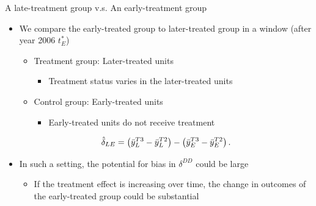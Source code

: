 \documentclass[dvipsnames,hyperref={pdfpagelabels=false}]{beamer}
\begin{document}
\begin{frame}{A late-treatment group v.s. An early-treatment group}{}
	\begin{itemize}
		
		\item We compare the early-treated group to
		later-treated group in a window (after year 2006 $t^{*}_{E}$)
		\vspace{0.2cm}
	\begin{itemize}
		\item Treatment group: Later-treated units
	\vspace{0.2cm}
	\begin{itemize}
		\item Treatment status varies in the later-treated units
	\end{itemize}
	\vspace{0.2cm}
		\item Control group: Early-treated units
		\vspace{0.2cm}
	\begin{itemize}
		\item Early-treated units do not receive treatment	
	\end{itemize}	
			\vspace{0.2cm}
	\end{itemize}	
		
		
		\begin{equation*}
			\hat{\delta}_{LE}=\left( \Bar{y}^{T3}_{L} - \Bar{y}^{T2}_{L}\right) - \left( \Bar{y}^{T3}_{E} - \Bar{y}^{T2}_{E}\right).
		\end{equation*}

	\item In such a setting, the potential for bias	in $\delta^{DD}$ could be large
						\vspace{0.2cm}
		\begin{itemize}
	\item If the treatment effect is increasing over time, the change in outcomes of the early-treated group could be substantial
		\end{itemize}
	
	
	
	
		
	\end{itemize}
\end{frame}
\end{document}
